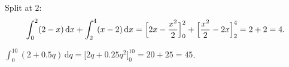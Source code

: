 \begin{solutions}
  \item Split at $2$:
        \[
          \int_{0}^{2} (2-x)\,\mathrm{d}x+\int_{2}^{4} (x-2)\,\mathrm{d}x
          =\Bigl[2x-\frac{x^{2}}{2}\Bigr]_{0}^{2}
           +\Bigl[\frac{x^{2}}{2}-2x\Bigr]_{2}^{4}
          =2+2=4 .
        \]

  \item $\displaystyle\int_{0}^{10} (2+0.5q)\,\mathrm{d}q
        =\bigl[2q+0.25q^{2}\bigr]_{0}^{10}=20+25=45$.
\end{solutions}
